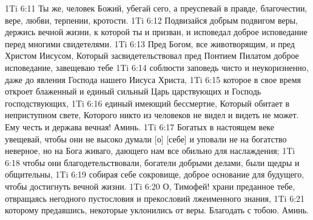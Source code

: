 1Ti 6:11  Ты же, человек Божий, убегай сего, а преуспевай в правде, благочестии, вере, любви, терпении, кротости.
1Ti 6:12  Подвизайся добрым подвигом веры, держись вечной жизни, к которой ты и призван, и исповедал доброе исповедание перед многими свидетелями.
1Ti 6:13  Пред Богом, все животворящим, и пред Христом Иисусом, Который засвидетельствовал пред Понтием Пилатом доброе исповедание, завещеваю тебе
1Ti 6:14  соблюсти заповедь чисто и неукоризненно, даже до явления Господа нашего Иисуса Христа,
1Ti 6:15  которое в свое время откроет блаженный и единый сильный Царь царствующих и Господь господствующих,
1Ti 6:16  единый имеющий бессмертие, Который обитает в неприступном свете, Которого никто из человеков не видел и видеть не может. Ему честь и держава вечная! Аминь.
1Ti 6:17  Богатых в настоящем веке увещевай, чтобы они не высоко думали [о] [себе] и уповали не на богатство неверное, но на Бога живаго, дающего нам все обильно для наслаждения;
1Ti 6:18  чтобы они благодетельствовали, богатели добрыми делами, были щедры и общительны,
1Ti 6:19  собирая себе сокровище, доброе основание для будущего, чтобы достигнуть вечной жизни.
1Ti 6:20  О, Тимофей! храни преданное тебе, отвращаясь негодного пустословия и прекословий лжеименного знания,
1Ti 6:21  которому предавшись, некоторые уклонились от веры. Благодать с тобою. Аминь.


